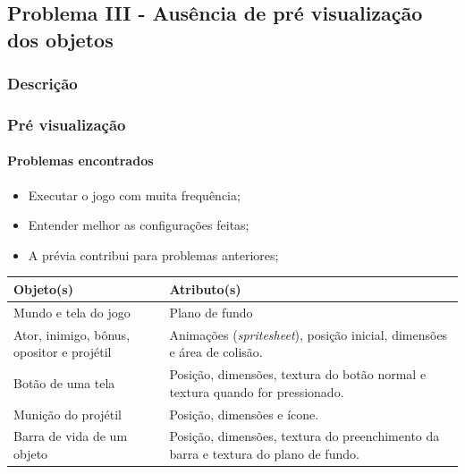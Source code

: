 \documentclass[]{beamer}
\begin{document}
   \subsection{Problema III - Ausência de pré visualização dos objetos}
   \subsubsection{Descrição}
   \begin{frame}
      \frametitle{Pré visualização}
      \framesubtitle{Problemas encontrados}
         \begin{itemize}
            \item Executar o jogo com muita frequência;
            \item Entender melhor as configurações feitas;
            \item A prévia contribui para problemas anteriores;
         \end{itemize}
   \end{frame}

   \begin{frame}
      \begin{center}
         \begin{tabular}{p{12em} | p{12em}}
            \textbf{Objeto(s)} & \textbf{Atributo(s)} \\
            \hline
            Mundo e tela do jogo & Plano de fundo \\
            \hline
            Ator, inimigo, bônus, opositor e projétil & Animações (\emph{spritesheet}), posição inicial, dimensões e área de colisão. \\
            \hline
            Botão de uma tela & Posição, dimensões, textura do botão normal e textura quando for pressionado.\\
            \hline
            Munição do projétil & Posição, dimensões e ícone. \\
            \hline
            Barra de vida de um objeto & Posição, dimensões, textura do preenchimento da barra e textura do plano de fundo. \\
         \end{tabular}
      \end{center}
   \end{frame}
\end{document}
